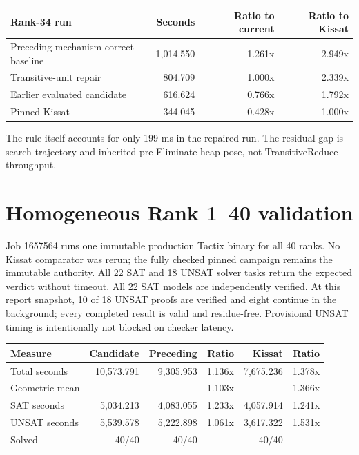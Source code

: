 \documentclass[11pt]{article}
\begin{document}
\begin{center}
\begin{tabular}{lrrr}
\toprule
Rank-34 run & Seconds & Ratio to current & Ratio to Kissat \\
\midrule
Preceding mechanism-correct baseline & 1,014.550 & 1.261x & 2.949x \\
Transitive-unit repair & 804.709 & 1.000x & 2.339x \\
Earlier evaluated candidate & 616.624 & 0.766x & 1.792x \\
Pinned Kissat & 344.045 & 0.428x & 1.000x \\
\bottomrule
\end{tabular}
\end{center}

The rule itself accounts for only 199 ms in the repaired run.  The residual
gap is search trajectory and inherited pre-Eliminate heap pose, not
TransitiveReduce throughput.

\section{Homogeneous Rank 1--40 validation}

Job 1657564 runs one immutable production Tactix binary for all 40 ranks.  No
Kissat comparator was rerun; the fully checked pinned campaign remains the
immutable authority.  All 22 SAT and 18 UNSAT solver tasks return the expected
verdict without timeout.  All 22 SAT models are independently verified.  At
this report snapshot, 10 of 18 UNSAT proofs are verified and eight continue in the
background; every completed result is valid and residue-free.  Provisional
UNSAT timing is intentionally not blocked on checker latency.

\begin{center}
\begin{tabular}{lrrrrr}
\toprule
Measure & Candidate & Preceding & Ratio & Kissat & Ratio \\
\midrule
Total seconds & 10,573.791 & 9,305.953 & 1.136x & 7,675.236 & 1.378x \\
Geometric mean & -- & -- & 1.103x & -- & 1.366x \\
SAT seconds & 5,034.213 & 4,083.055 & 1.233x & 4,057.914 & 1.241x \\
UNSAT seconds & 5,539.578 & 5,222.898 & 1.061x & 3,617.322 & 1.531x \\
Solved & 40/40 & 40/40 & -- & 40/40 & -- \\
\bottomrule
\end{tabular}
\end{center}
\end{document}
